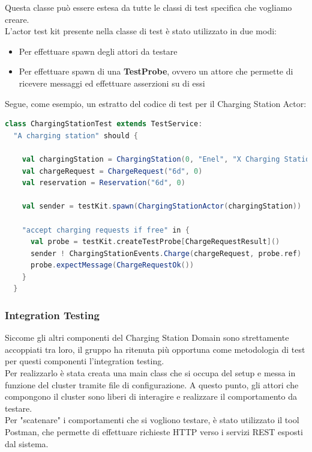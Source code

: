 Questa classe può essere estesa da tutte le classi di test specifica che vogliamo creare.\\

L'actor test kit presente nella classe di test è stato utilizzato in due modi:

\begin{itemize}
    \item Per effettuare spawn degli attori da testare
    \item Per effettuare spawn di una \textbf{TestProbe}, ovvero un attore che permette di ricevere messaggi ed effettuare asserzioni su di essi
\end{itemize}

Segue, come esempio, un estratto del codice di test per il Charging Station Actor:

\begin {lstlisting}[language=scala]
class ChargingStationTest extends TestService:
  "A charging station" should {

    val chargingStation = ChargingStation(0, "Enel", "X Charging Station", 100, Position(44.17457186518429, 12.23658150624628))
    val chargeRequest = ChargeRequest("6d", 0)
    val reservation = Reservation("6d", 0)

    val sender = testKit.spawn(ChargingStationActor(chargingStation))

    "accept charging requests if free" in {
      val probe = testKit.createTestProbe[ChargeRequestResult]()
      sender ! ChargingStationEvents.Charge(chargeRequest, probe.ref)
      probe.expectMessage(ChargeRequestOk())
    }
  }

\end{lstlisting}


\subsubsection{Integration Testing}
Siccome gli altri componenti del Charging Station Domain sono strettamente accoppiati tra loro, il gruppo ha ritenuta più opportuna come metodologia di test per questi componenti l'integration testing.\\
Per realizzarlo è stata creata una main class che si occupa del setup e messa in funzione del cluster tramite file di configurazione. A questo punto, gli attori che compongono il cluster sono liberi di interagire e realizzare il comportamento da testare.\\
Per "scatenare" i comportamenti che si vogliono testare, è stato utilizzato il tool Postman, che permette di effettuare richieste HTTP verso i servizi REST esposti dal sistema.\\

